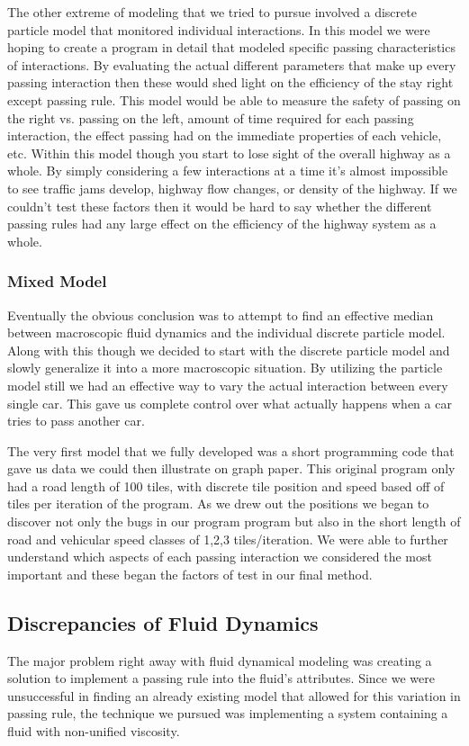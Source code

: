 \documentclass{amsart}
\begin{document}
	The other extreme of modeling that we tried to pursue involved a discrete particle model that monitored individual interactions.  In this model we were hoping to create a program in detail that modeled specific passing characteristics of interactions.  By evaluating the actual different parameters that make up every passing interaction then these would shed light on the efficiency of the stay right except passing rule.  This model would be able to measure the safety of passing on the right vs. passing on the left, amount of time required for each passing interaction, the effect passing had on the immediate properties of each vehicle, etc.  
	Within this model though you start to lose sight of the overall highway as a whole.  By simply considering a few interactions at a time it's almost impossible to see traffic jams develop, highway flow changes, or density of the highway.  If we couldn't test these factors then it would be hard to say whether the different passing rules had any large effect on the efficiency of the highway system as a whole.  
		
		\subsubsection{Mixed Model}
		
	Eventually the obvious conclusion was to attempt to find an effective median between macroscopic fluid dynamics and the individual discrete particle model.  Along with this though we decided to start with the discrete particle model and slowly generalize it into a more macroscopic situation.  By utilizing the particle model still we had an effective way to vary the actual interaction between every single car.  This gave us complete control over what actually happens when a car tries to pass another car.  
	
	The very first model that we fully developed was a short programming code that gave us data we could then illustrate on graph paper.  This original program only had a road length of 100 tiles, with discrete tile position and speed based off of tiles per iteration of the program.  As we drew out the positions we began to discover not only the bugs in our program program but also in the short length of road and vehicular speed classes of 1,2,3 tiles/iteration.  We were able to further understand which aspects of each passing interaction we considered the most important and these began the factors of test in our final method.  

	\subsection{Discrepancies of Fluid Dynamics}
	The major problem right away with fluid dynamical modeling was creating a solution to implement a passing rule into the fluid's attributes. Since we were unsuccessful in finding an already existing model that allowed for this variation in passing rule, the technique we pursued was implementing a system containing a fluid with non-unified viscosity. 
	
\end{document}
